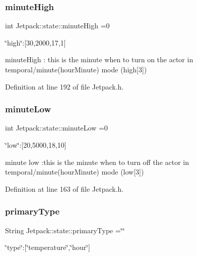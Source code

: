 \mbox{\label{struct_jetpack_1_1state_a8c26c18b0ec449b7545934cb01cca028}} 
\subsubsection{\texorpdfstring{minute\+High}{minuteHigh}}
{\footnotesize\ttfamily int Jetpack\+::state\+::minute\+High =0}

\char`\"{}high\char`\"{}\+:\mbox{[}30,2000,17,1\mbox{]}

minute\+High \+: this is the minute when to turn on the actor in temporal/minute(hour\+Minute) mode (high\mbox{[}3\mbox{]}) 

Definition at line 192 of file Jetpack.\+h.

\mbox{\label{struct_jetpack_1_1state_aa699e25d802a00e86d3a8032ec48b88b}} 
\subsubsection{\texorpdfstring{minute\+Low}{minuteLow}}
{\footnotesize\ttfamily int Jetpack\+::state\+::minute\+Low =0}

\char`\"{}low\char`\"{}\+:\mbox{[}20,5000,18,10\mbox{]}

minute low \+:this is the minute when to turn off the actor in temporal/minute(hour\+Minute) mode (low\mbox{[}3\mbox{]}) 

Definition at line 163 of file Jetpack.\+h.

\mbox{\label{struct_jetpack_1_1state_aa6242c32eb0ab42aaea170636ab949e1}} 
\subsubsection{\texorpdfstring{primary\+Type}{primaryType}}
{\footnotesize\ttfamily String Jetpack\+::state\+::primary\+Type =\char`\"{}\char`\"{}}

\char`\"{}type\char`\"{}\+:\mbox{[}\char`\"{}temperature\char`\"{},\char`\"{}hour\char`\"{}\mbox{]}

